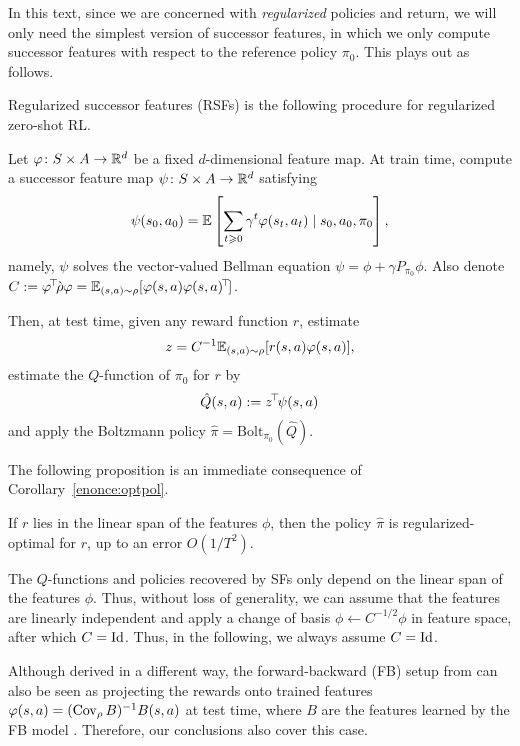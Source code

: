 \documentclass[11pt,a4paper]{article}
\newcommand{\Bol}{\mathrm{Bolt}_{\pi_0}}
\newcommand{\drho}{\grave \rho}
\begin{document}
\bigskip

In this text, since we are concerned with \emph{regularized} policies and
return, we will only need the simplest version of successor features, in
which we only compute successor features with respect to the reference policy
$\pi_0$. This plays out as follows.

\begin{defi}
\label{def:rsf}
Regularized successor features (RSFs) is the following procedure for
regularized zero-shot RL.

Let $\varphi\colon S\times A\to
{\mathbb{R}}^d$ be a fixed $d$-dimensional feature map. At train time, compute a successor feature map $\psi\colon
S\times A\to {\mathbb{R}}^d$ satisfying
\begin{equation}
\psi(s_0,a_0)=\mathbb{E}\left[
\sum_{t\geqslant 0} \gamma^t \varphi(s_t,a_t) \mid s_0,a_0,\pi_0
\right],
\end{equation}
namely, $\psi$ solves the vector-valued Bellman equation
$\psi=\phi+\gamma P_{\pi_0} \phi$.
Also denote $C\deq \transp{\phi}\drho\phi=
\E_{(s,a)\sim \rho}
[\phi(s,a)\transp{\phi(s,a)}]$.

Then, at test time, given any reward function $r$, estimate 
\begin{equation}
\label{eq:zrsf}
z=C^{-1}
 \mathbb{E}_{(s,a)\sim \rho} [r(s,a)\varphi(s,a)],
\end{equation}
estimate the $Q$-function of $\pi_0$ for $r$ by 
\begin{equation}
\label{eq:Qhatrsf}
\hat Q(s,a)\mathrel{\mathop{:}}=
z^{\!\top}\!\psi(s,a)
\end{equation}
and apply the Boltzmann policy
 $\hat \pi=\Bol(\hat Q)$.
\end{defi}

The following proposition is an immediate consequence of
Corollary~\ref{enonce:optpol}.

\begin{prop}
If $r$ lies in the linear span of the features $\phi$,  then
the policy $\hat \pi$ is regularized-optimal for $r$, up to an error $O(1/T^2)$.
\end{prop}

The $Q$-functions and policies recovered by SFs only depend on the linear
span of the features $\phi$. Thus, without loss of generality, we can
assume that the features are linearly independent and apply a
change of basis $\phi\gets C^{-1/2} \phi$ in feature space, after which
$C=\operatorname{Id}$. Thus, in the following, we always assume $C=\operatorname{Id}$.

Although derived in a different way, the forward-backward (FB) setup
from \cite{allpolicies,zeroshot} can also be seen as projecting the rewards onto trained
features $\varphi(s,a)=(\operatorname{Cov}_\rho B)^{-1} B(s,a)$ at test time, where
$B$ are the features learned by the FB model \cite{zeroshot}. Therefore, our conclusions also cover this
case.
\end{document}
